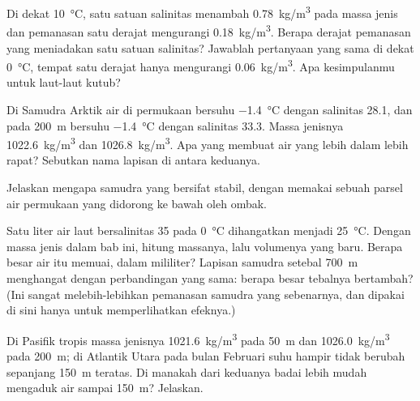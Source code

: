 \begin{exercise}[$\star\star$]\label{exo:g10:layered-ocean:9}
Di dekat \qty{10}{\degreeCelsius}, satu satuan salinitas menambah
\qty{0.78}{kg/m^3} pada massa jenis dan pemanasan satu derajat mengurangi
\qty{0.18}{kg/m^3}. Berapa derajat pemanasan yang meniadakan satu satuan
salinitas? Jawablah pertanyaan yang sama di dekat \qty{0}{\degreeCelsius},
tempat satu derajat hanya mengurangi \qty{0.06}{kg/m^3}. Apa kesimpulanmu
untuk laut-laut kutub?
\end{exercise}

\begin{exercise}[$\star\star$]\label{exo:g10:layered-ocean:10}
Di Samudra Arktik air di permukaan bersuhu \qty{-1.4}{\degreeCelsius} dengan
salinitas 28.1, dan pada \qty{200}{m} bersuhu \qty{-1.4}{\degreeCelsius}
dengan salinitas 33.3. Massa jenisnya \qty{1022.6}{kg/m^3} dan
\qty{1026.8}{kg/m^3}. Apa yang membuat air yang lebih dalam lebih rapat?
Sebutkan nama lapisan di antara keduanya.
\end{exercise}

\begin{exercise}[$\star\star$]\label{exo:g10:layered-ocean:11}
Jelaskan mengapa samudra yang  bersifat stabil, dengan memakai
sebuah parsel air permukaan yang didorong ke bawah oleh ombak.
\end{exercise}

\begin{exercise}[$\star\star\star$]\label{exo:g10:layered-ocean:12}
Satu liter air laut bersalinitas 35 pada \qty{0}{\degreeCelsius} dihangatkan
menjadi \qty{25}{\degreeCelsius}. Dengan massa jenis dalam bab ini, hitung
massanya, lalu volumenya yang baru. Berapa besar air itu memuai, dalam
mililiter? Lapisan samudra setebal \qty{700}{m} menghangat dengan perbandingan
yang sama: berapa besar tebalnya bertambah? (Ini sangat melebih-lebihkan
pemanasan samudra yang sebenarnya, dan dipakai di sini hanya untuk
memperlihatkan efeknya.)
\end{exercise}

\begin{exercise}[$\star\star\star$]\label{exo:g10:layered-ocean:13}
Di Pasifik tropis massa jenisnya \qty{1021.6}{kg/m^3} pada \qty{50}{m} dan
\qty{1026.0}{kg/m^3} pada \qty{200}{m}; di Atlantik Utara pada bulan Februari
suhu hampir tidak berubah sepanjang \qty{150}{m} teratas. Di manakah dari
keduanya badai lebih mudah mengaduk air sampai \qty{150}{m}? Jelaskan.
\end{exercise}

